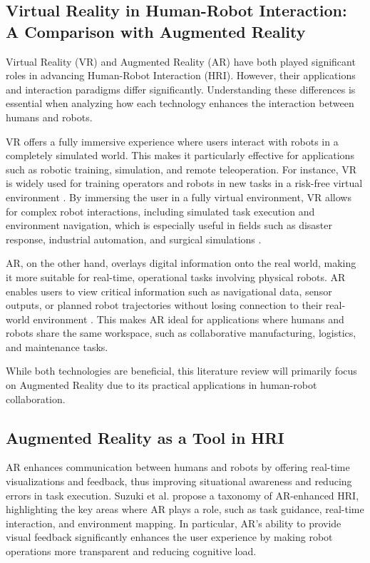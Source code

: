 \subsection{Virtual Reality in Human-Robot Interaction: A Comparison with Augmented Reality}

Virtual Reality (VR) and Augmented Reality (AR) have both played significant roles in advancing Human-Robot Interaction (HRI). However, their applications and interaction paradigms differ significantly. Understanding these differences is essential when analyzing how each technology enhances the interaction between humans and robots.

VR offers a fully immersive experience where users interact with robots in a completely simulated world. This makes it particularly effective for applications such as robotic training, simulation, and remote teleoperation. For instance, VR is widely used for training operators and robots in new tasks in a risk-free virtual environment \cite{Coronado2023}. By immersing the user in a fully virtual environment, VR allows for complex robot interactions, including simulated task execution and environment navigation, which is especially useful in fields such as disaster response, industrial automation, and surgical simulations \cite{Gul2022}.

AR, on the other hand, overlays digital information onto the real world, making it more suitable for real-time, operational tasks involving physical robots. AR enables users to view critical information such as navigational data, sensor outputs, or planned robot trajectories without losing connection to their real-world environment \cite{García2019}. This makes AR ideal for applications where humans and robots share the same workspace, such as collaborative manufacturing, logistics, and maintenance tasks.

While both technologies are beneficial, this literature review will primarily focus on Augmented Reality due to its practical applications in human-robot collaboration. 

\subsection{Augmented Reality as a Tool in HRI}

AR enhances communication between humans and robots by offering real-time visualizations and feedback, thus improving situational awareness and reducing errors in task execution. Suzuki et al. \cite{Suzuki2022} propose a taxonomy of AR-enhanced HRI, highlighting the key areas where AR plays a role, such as task guidance, real-time interaction, and environment mapping. In particular, AR’s ability to provide visual feedback significantly enhances the user experience by making robot operations more transparent and reducing cognitive load.

